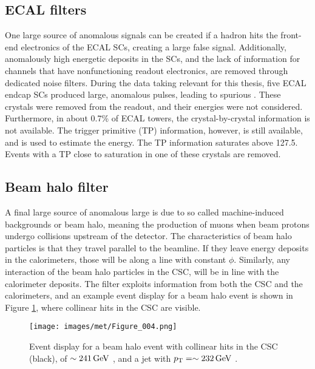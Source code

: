 \subsection*{ECAL filters}
\noindent\justify
One large source of anomalous \ptmiss signals can be created if a hadron hits the front-end electronics of the ECAL SCs, creating a large false signal.  
Additionally, anomalously high energetic deposits in the SCs, and the lack of information for channels that have nonfunctioning readout electronics, are removed through dedicated noise filters.
During the data taking relevant for this thesis, five ECAL endcap SCs produced large, anomalous pulses, leading to spurious \ptmiss. 
These crystals were removed from the readout, and their energies were not considered.
Furthermore, in about 0.7\% of ECAL towers, the crystal-by-crystal information is not available. 
The trigger primitive (TP) information, however, is still available, and is used to estimate the energy. 
The TP information saturates above 127.5\GeV. Events with a TP close to saturation in one of these crystals are removed.
\subsection*{Beam halo filter}
\noindent\justify
A final large source of anomalous large \ptmiss is due to so called machine-induced backgrounds or beam halo, meaning the production of muons when beam protons undergo collisions upstream of the detector. 
The characteristics of beam halo particles is that they travel parallel to the beamline. 
If they leave energy deposits in the calorimeters, those will be along a line with constant $\phi$. 
Similarly, any interaction of the beam halo particles in the CSC, will be in line with the calorimeter deposits.  
The filter exploits information from both the CSC and the calorimeters, and an example event display for a beam halo event is shown in Figure \ref{fig:beamhalo}, where collinear hits in the CSC are visible. 
\begin{figure}[!htp]
\centering
\texttt{[image: images/met/Figure\_004.png]}
\caption{Event display for a beam halo event with collinear hits in the CSC (black), \ptmiss of $\sim241\,\text{Ge\hspace{-.08em}V}$ , and a jet with $p_{\mathrm{T}}=\sim232\,\text{Ge\hspace{-.08em}V}$ \cite{Sirunyan:2019kia}.}
\label{fig:beamhalo}
\end{figure}
